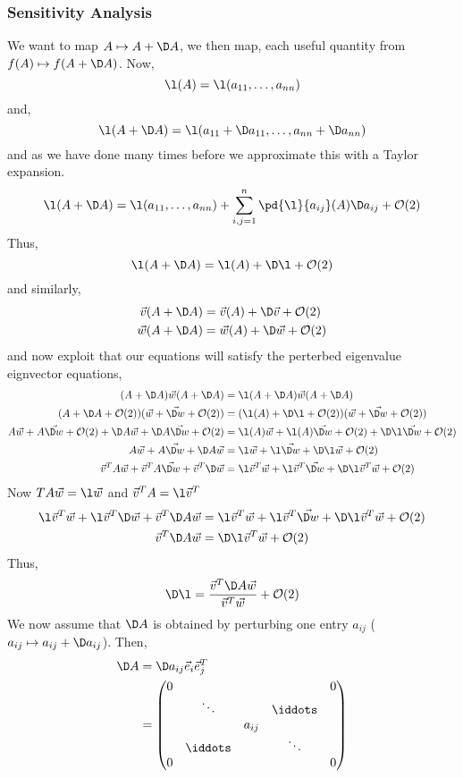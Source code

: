 \subsubsection{Sensitivity Analysis}
We want to map $A \mapsto A + \D A$, we then map, each useful quantity from $f(A) \mapsto f(A + \D A)$. Now,
$$ \l(A) = \l(a_{11}, \dots, a_{nn}) $$
and,
$$ \l(A+ \D A) = \l(a_{11} + \D a_{11}, \dots, a_{nn} + \D a_{nn}) $$
and as we have done many times before we approximate this with a Taylor expansion.
\begin{align*}
  \l(A + \D A) = \l(a_{11}, \dots, a_{nn}) + \sum_{i, j = 1}^n \pd{\l}{a_{ij}}(A)\D a_{ij} + \mathcal{O}(2)
\end{align*}
Thus,
$$ \l(A + \D A) = \l(A) + \D\l + \mathcal{O}(2) $$
and similarly,
\begin{align*}
  \vec v (A + \D A) &= \vec v(A) + \D\vec v + \mathcal{O}(2)\\
  \vec w (A + \D A) &= \vec w(A) + \D\vec w + \mathcal{O}(2)\\
\end{align*}
and now exploit that our equations will satisfy the perterbed eigenvalue eignvector equations,
\begin{align*}
  (A + \D A)\vec w(A + \D A) &= \l(A + \D A)\vec w(A + \D A)\\
  (A + \D A + \mathcal{O}(2))(\vec w + \vec{ \D w} + \mathcal{O}(2)) &= (\l(A) + \D\l + \mathcal{O}(2))(\vec w + \vec{\D w} + \mathcal{O}(2))\\
  A\vec w + A\vec{\D w} + \mathcal{O}(2) + \D A\vec w + \D A\vec{\D w} + \mathcal{O}(2) &= \l(A)\vec w + \l(A)\vec{\D w} + \mathcal{O}(2) + \D\l\vec{\D w} + \mathcal{O}(2) \\
  A\vec w + A\vec{\D w} + \D A\vec w &= \l\vec w + \l\vec{\D w} + \D\l\vec{w} + \mathcal{O}(2) \\
  \vec v^T A\vec w + \vec v^T A\vec{\D w} + \vec v^T\D \vec w &= \l\vec v^T\vec w + \l\vec v^T\vec{\D w} + \D\l\vec v^T\vec{w} + \mathcal{O}(2)
\end{align*}
Now $TA\vec w = \l\vec w$ and $\vec v^T A = \l\vec v^T $
\begin{align*}
  \l\vec v^T\vec w + \l\vec v^T \D\vec{ w} + \vec v^T\D A\vec w &= \l\vec v^T\vec w + \l\vec v^T\vec{\D w} + \D\l\vec v^T\vec{w} + \mathcal{O}(2) \\
  \vec v^T\D A\vec w &=\D\l\vec v^T\vec{w} + \mathcal{O}(2)
\end{align*}
Thus,
$$ \D\l = \frac{\vec v^T\D A\vec w}{\vec v^T \vec w} + \mathcal{O}(2) $$
We now assume that $\D A$ is obtained by perturbing one entry $a_{ij}$ ($a_{ij} \mapsto a_{ij} + \D a_{ij}$). Then, \begin{align*}
  \D A &= \D a_{ij} \vec e_i \vec e_j^T \\
  &= \begin{pmatrix}
    0 &&&& 0 \\
    & \ddots &&\iddots& \\
    &&a_{ij}&&\\
    & \iddots &&\ddots&\\
    0 &&&& 0
\end{pmatrix}
\end{align*}
